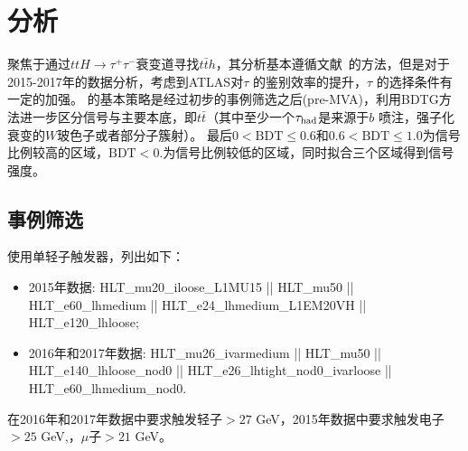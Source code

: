 \section{\ltwotau 分析}\label{sec:1l2tau}
\ltwotau 聚焦于通过$ttH\rightarrow \tau^+\tau^-$衰变道寻找$t\bar{t}h$，其分析基本遵循文献~\cite{Aaboud:2017jvq}的方法，但是对于2015-2017年的数据分析，考虑到ATLAS对$\tau$ 的鉴别效率的提升，$\tau$ 的选择条件有一定的加强。
\ltwotau 的基本策略是经过初步的事例筛选之后(pre-MVA)，利用BDTG\cite{Hocker:2007ht}方法进一步区分信号与主要本底，即$t\bar{t}$（其中至少一个$\tau_{\text{had}}$是来源于$b$ 喷注，强子化衰变的$W$玻色子或者部分子簇射）。
最后$0<\text{BDT}\le 0.6$和$0.6<\text{BDT}\le 1.0$为信号比例较高的区域，$\text{BDT}<0.$为信号比例较低的区域，同时拟合三个区域得到信号强度。

\subsection{事例筛选}
\ltwotau 使用单轻子触发器，列出如下：
\begin{itemize}
\item 2015年数据: HLT\_mu20\_iloose\_L1MU15 || HLT\_mu50 || HLT\_e60\_lhmedium || 
 HLT\_e24\_lhmedium\_L1EM20VH || HLT\_e120\_lhloose;
\item 2016年和2017年数据: HLT\_mu26\_ivarmedium || HLT\_mu50 || HLT\_e140\_lhloose\_nod0 || 
HLT\_e26\_lhtight\_nod0\_ivarloose || HLT\_e60\_lhmedium\_nod0.\\
\end{itemize}
在2016年和2017年数据中要求触发轻子\pT$>27$ GeV，2015年数据中要求触发电子\pt$>25$ GeV,，$\mu$子\pt$>21$ GeV。

